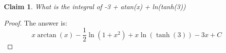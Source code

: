 \documentclass{article}
\newtheorem{theorem}{Claim}
\begin{document}
\begin{theorem}
What is the integral of -3 + atan(x) + ln(tanh(3))
\end{theorem}

\begin{proof}
The answer is:
\[
x \arctan(x) - \frac{1}{2} \ln(1 + x^2) + x \ln(\tanh(3)) - 3x + C
\]
\end{proof}
\end{document}
